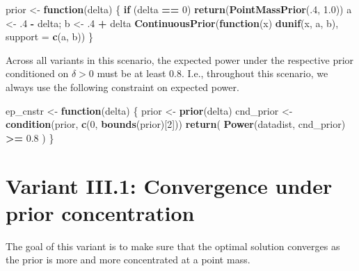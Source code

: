 \documentclass[
]{book}
\newenvironment{Shaded}{\begin{snugshade}}{\end{snugshade}}
\newcommand{\ControlFlowTok}[1]{\textcolor[rgb]{0.13,0.29,0.53}{\textbf{#1}}}
\newcommand{\DataTypeTok}[1]{\textcolor[rgb]{0.13,0.29,0.53}{#1}}
\newcommand{\DecValTok}[1]{\textcolor[rgb]{0.00,0.00,0.81}{#1}}
\newcommand{\FloatTok}[1]{\textcolor[rgb]{0.00,0.00,0.81}{#1}}
\newcommand{\KeywordTok}[1]{\textcolor[rgb]{0.13,0.29,0.53}{\textbf{#1}}}
\newcommand{\NormalTok}[1]{#1}
\newcommand{\OperatorTok}[1]{\textcolor[rgb]{0.81,0.36,0.00}{\textbf{#1}}}
\newcommand{\StringTok}[1]{\textcolor[rgb]{0.31,0.60,0.02}{#1}}
\begin{document}
\begin{Shaded}
\begin{Highlighting}[]
\NormalTok{prior \textless{}{-}}\StringTok{ }\ControlFlowTok{function}\NormalTok{(delta) \{}
    \ControlFlowTok{if}\NormalTok{ (delta }\OperatorTok{==}\StringTok{ }\DecValTok{0}\NormalTok{)}
        \KeywordTok{return}\NormalTok{(}\KeywordTok{PointMassPrior}\NormalTok{(.}\DecValTok{4}\NormalTok{, }\FloatTok{1.0}\NormalTok{))}
\NormalTok{    a \textless{}{-}}\StringTok{ }\FloatTok{.4} \OperatorTok{{-}}\StringTok{ }\NormalTok{delta; b \textless{}{-}}\StringTok{ }\FloatTok{.4} \OperatorTok{+}\StringTok{ }\NormalTok{delta}
    \KeywordTok{ContinuousPrior}\NormalTok{(}\ControlFlowTok{function}\NormalTok{(x) }\KeywordTok{dunif}\NormalTok{(x, a, b), }\DataTypeTok{support =} \KeywordTok{c}\NormalTok{(a, b))}
\NormalTok{\}}
\end{Highlighting}
\end{Shaded}

Across all variants in this scenario, the expected power under the respective
prior conditioned on \(\delta > 0\) must be at least \(0.8\).
I.e., throughout this scenario, we always use the following constraint on
expected power.

\begin{Shaded}
\begin{Highlighting}[]
\NormalTok{ep\_cnstr \textless{}{-}}\StringTok{ }\ControlFlowTok{function}\NormalTok{(delta) \{}
\NormalTok{    prior     \textless{}{-}}\StringTok{ }\KeywordTok{prior}\NormalTok{(delta)}
\NormalTok{    cnd\_prior \textless{}{-}}\StringTok{ }\KeywordTok{condition}\NormalTok{(prior, }\KeywordTok{c}\NormalTok{(}\DecValTok{0}\NormalTok{, }\KeywordTok{bounds}\NormalTok{(prior)[}\DecValTok{2}\NormalTok{]))}
    \KeywordTok{return}\NormalTok{( }\KeywordTok{Power}\NormalTok{(datadist, cnd\_prior) }\OperatorTok{\textgreater{}=}\StringTok{ }\FloatTok{0.8}\NormalTok{ )}
\NormalTok{\}}
\end{Highlighting}
\end{Shaded}

\hypertarget{variantIII_1}{%
\section{Variant III.1: Convergence under prior concentration}\label{variantIII_1}}

The goal of this variant is to make sure that the optimal solution
converges as the prior is more and more concentrated at a point mass.
\end{document}
